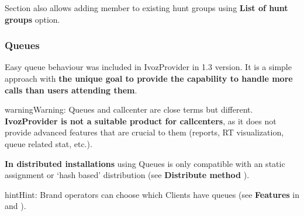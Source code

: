 \documentclass[letterpaper,10pt,english]{sphinxmanual}
\begin{document}
Section {\hyperref[administration_portal/client/vpbx/users:users]{}} also allows adding member to existing hunt groups using \textbf{List of hunt groups} option.


\subsubsection{Queues}
\label{administration_portal/client/vpbx/routing_endpoints/queues:queues}\label{administration_portal/client/vpbx/routing_endpoints/queues::doc}
Easy queue behaviour was included in IvozProvider in 1.3 version. It is a simple
approach with \textbf{the unique goal to provide the capability to handle more calls
than users attending them}.

\begin{notice}{warning}{Warning:}
Queues and callcenter are close terms but different. \textbf{IvozProvider
is not a suitable product for callcenters}, as it does not provide
advanced features that are crucial to them (reports, RT visualization,
queue related stat, etc.).
\end{notice}

\textbf{In distributed installations} using Queues is only compatible with an static
assignment or `hash based' distribution (see \textbf{Distribute method} {\hyperref[administration_portal/brand/clients/virtual_pbx:virtual\string-pbx]{}}).

\begin{notice}{hint}{Hint:}
Brand operators can choose which Clients have queues (see \textbf{Features}
in {\hyperref[getting_started/internal_calls/brand_portal:brand\string-configuration]{}} and {\hyperref[getting_started/internal_calls/client_portal:client\string-configuration]{}}).
\end{notice}
\end{document}
